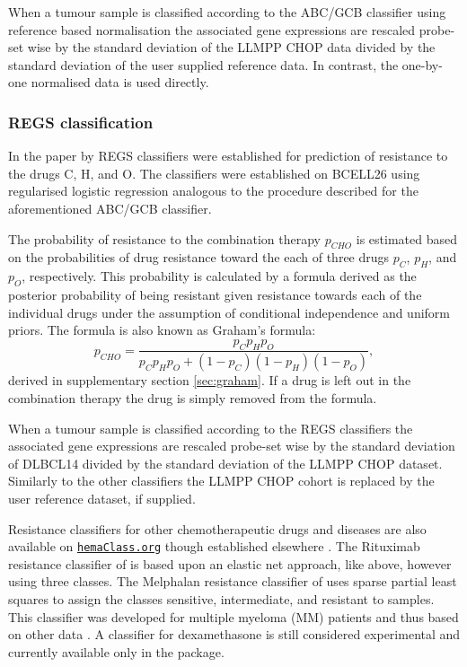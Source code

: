 \documentclass{bmcart}
\newcommand{\hemaClass}{\href{http://hemaClass.org}{\texttt{hemaClass.org}}}
\begin{document}
When a tumour sample is classified according to the ABC/GCB classifier using reference based normalisation the associated gene expressions are rescaled probe-set wise by the standard deviation of the LLMPP CHOP data divided by the standard deviation of the user supplied reference data.
In contrast, the one-by-one normalised data is used directly.



\subsubsection{REGS classification}
\label{sec:regsmethods}
In the paper by \citet{Falgreen2015} REGS classifiers were established for prediction of resistance to the drugs C, H, and O.
The classifiers were established on BCELL26 using regularised logistic regression analogous to the procedure described for the aforementioned ABC/GCB classifier.

The probability of resistance to the combination therapy $p_{CHO}$ is estimated based on the probabilities of drug resistance toward the each of three drugs $p_C$, $p_H$, and $p_O$, respectively.
This probability is calculated by a formula derived as the posterior probability of being resistant given resistance towards each of the individual drugs under the assumption of conditional independence and uniform priors.
The formula is also known as Graham's formula:
\begin{equation*}
  p_{CHO} = \frac{p_C p_H p_O}{p_C p_H p_O + (1 - p_C)(1 - p_H)(1 - p_O)},
\end{equation*}
derived in supplementary section \ref{sec:graham}.
If a drug is left out in the combination therapy the drug is simply removed from the formula.

When a tumour sample is classified according to the REGS classifiers the associated gene expressions are rescaled probe-set wise by the standard deviation of DLBCL14 divided by the standard deviation of the LLMPP CHOP dataset.
Similarly to the other classifiers the LLMPP CHOP cohort is replaced by the user reference dataset, if supplied.

Resistance classifiers for other chemotherapeutic drugs and diseases are also available on \hemaClass{} though established elsewhere \citep{Boegsted2011,Bogsted2013,Laursen2014}.
The Rituximab resistance classifier of \citet{Laursen2014} is based upon an elastic net approach, like above, however using three classes.
The Melphalan resistance classifier of \citet{Boegsted2011} uses sparse partial least squares to assign the classes sensitive, intermediate, and resistant to samples.
This classifier was developed for multiple myeloma (MM) patients and thus based on other data \citep{Boegsted2011}.
A classifier for dexamethasone is still considered experimental and currently available only in the package.
\end{document}
